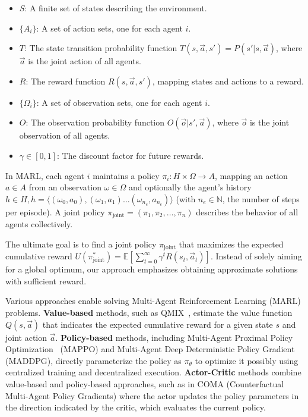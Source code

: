 \documentclass[conference]{IEEEtran}
\begin{document}
\begin{itemize}
    \item $S$: A finite set of states describing the environment.
    \item $\{A_i\}$: A set of action sets, one for each agent $i$.
    \item $T$: The state transition probability function $T(s, \vec{a}, s') = P(s'|s, \vec{a})$, where $\vec{a}$ is the joint action of all agents.
    \item $R$: The reward function $R(s, \vec{a}, s')$, mapping states and actions to a reward.
    \item $\{\Omega_i\}$: A set of observation sets, one for each agent $i$.
    \item $O$: The observation probability function $O(\vec{o} | s', \vec{a})$, where $\vec{o}$ is the joint observation of all agents.
    \item $\gamma \in [0,1]$: The discount factor for future rewards.
\end{itemize}

In MARL, each agent $i$ maintains a policy $\pi_i: H \times \Omega \rightarrow A$, mapping an action $a \in A$ from an observation $\omega \in \Omega$ and optionally the agent's history $h \in H, h=\langle(\omega_0,a_0),(\omega_1,a_1)\dots(\omega_{n_e},a_{n_e})\rangle$ (with $n_e \in \mathbb{N}$, the number of steps per episode). A joint policy $\pi_{\text{joint}} = (\pi_1, \pi_2, \ldots, \pi_n)$ describes the behavior of all agents collectively.

The ultimate goal is to find a joint policy $\pi_{\text{joint}}$ that maximizes the expected cumulative reward $U(\pi^*_{\text{joint}}) = \mathbb{E}\left[\sum_{t=0}^{\infty} \gamma^t R(s_t, \vec{a}_t)\right]$. Instead of solely aiming for a global optimum, our approach emphasizes obtaining approximate solutions with sufficient reward.

Various approaches enable solving Multi-Agent Reinforcement Learning (MARL) problems. \textbf{Value-based} methods, such as QMIX~\cite{rashid2018}, estimate the value function $Q(s,\vec{a})$ that indicates the expected cumulative reward for a given state $s$ and joint action $\vec{a}$. \textbf{Policy-based} methods, including Multi-Agent Proximal Policy Optimization~\cite{yu2022surprising} (MAPPO) and Multi-Agent Deep Deterministic Policy Gradient~\cite{lowe2017multi} (MADDPG), directly parameterize the policy as $\pi_\theta$ to optimize it possibly using centralized training and decentralized execution. \textbf{Actor-Critic} methods combine value-based and policy-based approaches, such as in COMA (Counterfactual Multi-Agent Policy Gradients) where the actor updates the policy parameters in the direction indicated by the critic, which evaluates the current policy.
\end{document}
